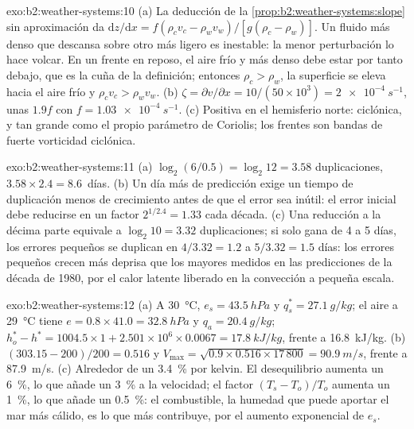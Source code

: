 \begin{solution}{exo:b2:weather-systems:10}
(a) La deducción de la \cref{prop:b2:weather-systems:slope} sin aproximación da
$\mathrm{d}z/\mathrm{d}x = f(\rho_c v_c - \rho_w v_w)/[g(\rho_c - \rho_w)]$. Un fluido más denso
que descansa sobre otro más ligero es inestable: la menor perturbación lo hace volcar. En un frente en
reposo, el aire frío y más denso debe estar por tanto debajo, que es la cuña de la definición; entonces
$\rho_c > \rho_w$, la superficie se eleva hacia el aire frío y $\rho_c v_c > \rho_w v_w$.
(b) $\zeta = \partial v/\partial x = 10/(50 \times 10^3) = \qty{2e-4}{s^{-1}}$, unas $1.9f$ con
$f = \qty{1.03e-4}{s^{-1}}$. (c) Positiva en el hemisferio norte: ciclónica, y tan grande como
el propio parámetro de Coriolis; los frentes son bandas de fuerte vorticidad ciclónica.
\end{solution}

\begin{solution}{exo:b2:weather-systems:11}
(a) $\log_2(6/0.5) = \log_2 12 = 3.58$ duplicaciones, $3.58 \times 2.4 = 8.6$~días. (b) Un
día más de predicción exige un tiempo de duplicación menos de crecimiento antes de que el error sea inútil: el
error inicial debe reducirse en un factor $2^{1/2.4} = 1.33$ cada década. (c) Una reducción a la décima parte equivale a
$\log_2 10 = 3.32$ duplicaciones; si solo gana de 4 a 5 días, los errores pequeños se duplican en $4/3.32 = 1.2$
a $5/3.32 = 1.5$ días: los errores pequeños crecen más deprisa que los mayores medidos en las
predicciones de la década de 1980, por el calor latente liberado en la convección a pequeña escala.
\end{solution}

\begin{solution}{exo:b2:weather-systems:12}
(a) A \qty{30}{\celsius}, $e_s = \qty{43.5}{hPa}$ y $q_s^* = \qty{27.1}{g/kg}$; el aire a
\qty{29}{\celsius} tiene $e = 0.8 \times 41.0 = \qty{32.8}{hPa}$ y $q_a = \qty{20.4}{g/kg}$;
$h_o^* - h^* = 1004.5 \times 1 + 2.501 \times 10^6 \times 0.0067 = \qty{17.8}{kJ/kg}$, frente a
\qty{16.8}{kJ/kg}. (b) $(303.15 - 200)/200 = 0.516$ y $V_{\max} = \sqrt{0.9 \times 0.516
\times 17\,800} = \qty{90.9}{m/s}$, frente a \qty{87.9}{m/s}. (c) Alrededor de un \qty{3.4}{\percent} por
kelvin. El desequilibrio aumenta un \qty{6}{\percent}, lo que añade un \qty{3}{\percent} a la velocidad;
el factor $(T_s - T_o)/T_o$ aumenta un \qty{1}{\percent}, lo que añade un \qty{0.5}{\percent}: el
combustible, la humedad que puede aportar el mar más cálido, es lo que más contribuye, por el aumento exponencial de
$e_s$.
\end{solution}

